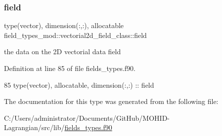 \subsubsection{\texorpdfstring{field}{field}}
{\footnotesize\ttfamily type(vector), dimension(\+:,\+:), allocatable field\+\_\+types\+\_\+mod\+::vectorial2d\+\_\+field\+\_\+class\+::field\hspace{0.3cm}{\ttfamily [private]}}



the data on the 2D vectorial data field 



Definition at line 85 of file fields\+\_\+types.\+f90.


\begin{DoxyCode}
85         \textcolor{keywordtype}{type}(vector), \textcolor{keywordtype}{allocatable}, \textcolor{keywordtype}{dimension(:,:)} :: field
\end{DoxyCode}


The documentation for this type was generated from the following file\+:\begin{DoxyCompactItemize}
\item 
C\+:/\+Users/administrator/\+Documents/\+Git\+Hub/\+M\+O\+H\+I\+D-\/\+Lagrangian/src/lib/\mbox{\hyperlink{fields__types_8f90}{fields\+\_\+types.\+f90}}\end{DoxyCompactItemize}
